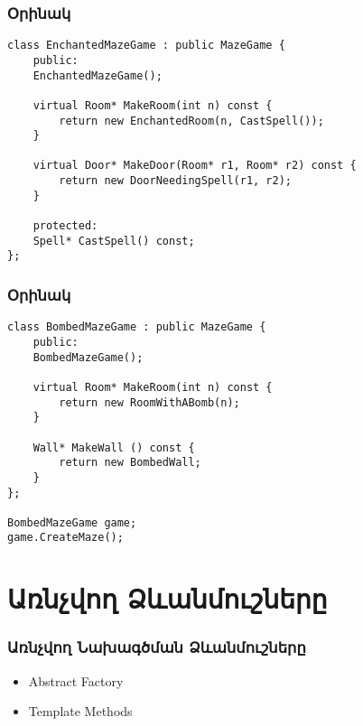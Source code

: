 \documentclass{beamer}
\begin{document}
\begin{frame}[fragile]\frametitle{Օրինակ}
\begin{english}
\begin{verbatim}
class EnchantedMazeGame : public MazeGame {
    public:
    EnchantedMazeGame();

    virtual Room* MakeRoom(int n) const {
        return new EnchantedRoom(n, CastSpell());
    }

    virtual Door* MakeDoor(Room* r1, Room* r2) const {
        return new DoorNeedingSpell(r1, r2);
    }

    protected:
    Spell* CastSpell() const;
};
\end{verbatim}
\end{english}
\end{frame}

\begin{frame}[fragile]\frametitle{Օրինակ}
\begin{english}
\begin{verbatim}
class BombedMazeGame : public MazeGame {
    public:
    BombedMazeGame();

    virtual Room* MakeRoom(int n) const {
        return new RoomWithABomb(n);
    }

    Wall* MakeWall () const {
        return new BombedWall;
    }
};

BombedMazeGame game;
game.CreateMaze();
\end{verbatim}
\end{english}
\end{frame}

\section{Առնչվող Ձևանմուշները}
\begin{frame}\frametitle{Առնչվող Նախագծման Ձևանմուշները}
\begin{itemize}
    \item Abstract Factory \vfill
    \item Template Methods
\end{itemize}
\end{frame}
\end{document}
